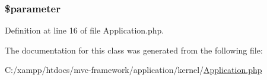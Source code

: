 \subsubsection[{\$parameter}]{\setlength{\rightskip}{0pt plus 5cm}\$parameter\hspace{0.3cm}{\ttfamily [protected]}}\label{class_application_aaa59205ae9efcb66a11d385fe346253a}


Definition at line 16 of file Application.\+php.



The documentation for this class was generated from the following file\+:\begin{DoxyCompactItemize}
\item 
C\+:/xampp/htdocs/mvc-\/framework/application/kernel/\hyperlink{_application_8php}{Application.\+php}\end{DoxyCompactItemize}
